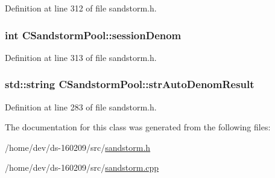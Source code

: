 Definition at line 312 of file sandstorm.\+h.

\hypertarget{class_c_sandstorm_pool_a29ef4f682594e010c8401617463fb57e}{}
\subsubsection[{session\+Denom}]{\setlength{\rightskip}{0pt plus 5cm}int C\+Sandstorm\+Pool\+::session\+Denom}\label{class_c_sandstorm_pool_a29ef4f682594e010c8401617463fb57e}


Definition at line 313 of file sandstorm.\+h.

\hypertarget{class_c_sandstorm_pool_aa9137e1fe81c9f7a8edd55b2705a1938}{}
\subsubsection[{str\+Auto\+Denom\+Result}]{\setlength{\rightskip}{0pt plus 5cm}std\+::string C\+Sandstorm\+Pool\+::str\+Auto\+Denom\+Result}\label{class_c_sandstorm_pool_aa9137e1fe81c9f7a8edd55b2705a1938}


Definition at line 283 of file sandstorm.\+h.



The documentation for this class was generated from the following files\+:\begin{DoxyCompactItemize}
\item 
/home/dev/ds-\/160209/src/\hyperlink{sandstorm_8h}{sandstorm.\+h}\item 
/home/dev/ds-\/160209/src/\hyperlink{sandstorm_8cpp}{sandstorm.\+cpp}\end{DoxyCompactItemize}
